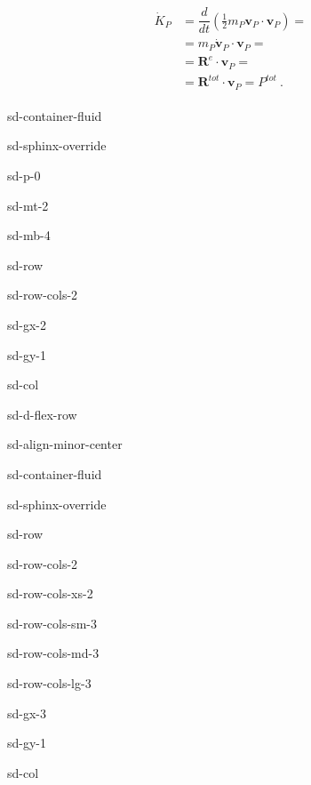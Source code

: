 \documentclass[letterpaper,10pt,english]{jupyterBook}
\begin{document}
\sphinxAtStartPar
{}
\begin{equation*}
\begin{split}\begin{aligned}
\dot{K}_{P} & = \dfrac{d}{dt} \left( \frac{1}{2} m_P \mathbf{v}_P \cdot \mathbf{v}_P \right) = \\
            & = m_P \dot{\mathbf{v}}_P \cdot \mathbf{v}_P = \\
            & = \mathbf{R}^e \cdot \mathbf{v}_P = \\
            & = \mathbf{R}^{tot} \cdot \mathbf{v}_P = P^{tot} \ .
\end{aligned}\end{split}
\end{equation*}
\sphinxstepscope

\begin{sphinxuseclass}{sd-container-fluid}
\begin{sphinxuseclass}{sd-sphinx-override}
\begin{sphinxuseclass}{sd-p-0}
\begin{sphinxuseclass}{sd-mt-2}
\begin{sphinxuseclass}{sd-mb-4}
\begin{sphinxuseclass}{sd-row}
\begin{sphinxuseclass}{sd-row-cols-2}
\begin{sphinxuseclass}{sd-gx-2}
\begin{sphinxuseclass}{sd-gy-1}
\begin{sphinxuseclass}{sd-col}
\begin{sphinxuseclass}{sd-d-flex-row}
\begin{sphinxuseclass}{sd-align-minor-center}
\begin{sphinxuseclass}{sd-container-fluid}
\begin{sphinxuseclass}{sd-sphinx-override}
\begin{sphinxuseclass}{sd-row}
\begin{sphinxuseclass}{sd-row-cols-2}
\begin{sphinxuseclass}{sd-row-cols-xs-2}
\begin{sphinxuseclass}{sd-row-cols-sm-3}
\begin{sphinxuseclass}{sd-row-cols-md-3}
\begin{sphinxuseclass}{sd-row-cols-lg-3}
\begin{sphinxuseclass}{sd-gx-3}
\begin{sphinxuseclass}{sd-gy-1}
\begin{sphinxuseclass}{sd-col}

\end{sphinxuseclass}
\end{sphinxuseclass}
\end{sphinxuseclass}
\end{sphinxuseclass}
\end{sphinxuseclass}
\end{sphinxuseclass}
\end{sphinxuseclass}
\end{sphinxuseclass}
\end{sphinxuseclass}
\end{sphinxuseclass}
\end{sphinxuseclass}
\end{sphinxuseclass}
\end{sphinxuseclass}
\end{sphinxuseclass}
\end{sphinxuseclass}
\end{sphinxuseclass}
\end{sphinxuseclass}
\end{sphinxuseclass}
\end{sphinxuseclass}
\end{sphinxuseclass}
\end{sphinxuseclass}
\end{sphinxuseclass}
\end{sphinxuseclass}
\end{document}
